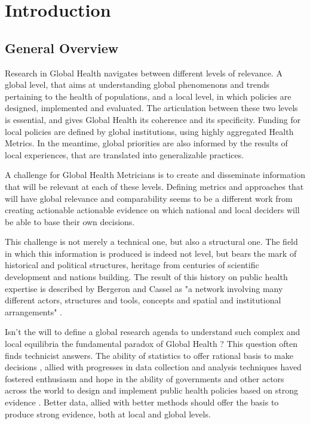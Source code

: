 \section{Introduction}

\subsection{General Overview}

Research in Global Health navigates between different levels of relevance. A global level, that aims at understanding global phenomenons and trends pertaining to the health of populations, and a local level, in which policies are designed, implemented and evaluated. The articulation between these two levels is essential, and gives Global Health its coherence and its specificity. Funding for local policies are defined by global institutions, using highly aggregated Health Metrics. In the meantime, global priorities are also informed by the results of local experiences, that are translated into generalizable practices.

A challenge for Global Health Metricians is to create and disseminate information that will be relevant at each of these levels. Defining metrics and approaches that will have global relevance and comparability seems to be a different work from creating actionable actionable evidence on which national and local deciders will be able to base their own decisions.

This challenge is not merely a technical one, but also a structural one. The field in which this information is produced is indeed not level, but bears the mark of historical and political structures, heritage from centuries of scientific development and nations building. The result of this history on public health expertise is described by Bergeron and Cassel as "a network involving many different actors, structures and tools, concepts and spatial and institutional arrangements" \citep{bergeron_savoirs_2014}.

Isn't the will to define a global research agenda to understand such complex and local equilibria the fundamental paradox of Global Health ? This question often finds technicist answers. The ability of statistics to offer rational basis to make decisions \citep{desrosieres_politique_1993,porter_trust_1996},
allied with progresses in data collection and analysis techniques haved fostered enthusiasm and hope in the ability of governments and other actors across the world to design and implement public health policies based on strong evidence \citep{abou-zahr_health_2005,shibuya_health_2005,bambas_nolen_strengthening_2005,mutemwa_hmis_2006,boerma_public_2013}. Better data, allied with better methods should  offer the basis to produce strong evidence, both at local and global levels.

